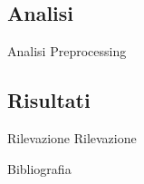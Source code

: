 \documentclass[xcolor={dvipsnames}]{beamer}%
\begin{document}
	\subsection{Analisi}
		\begin{frame}{Analisi}
			Preprocessing
		\end{frame}
	
	\subsection{Risultati}
		\begin{frame}{Rilevazione}
			Rilevazione
		\end{frame}

	\begin{frame}{Bibliografia}
	{
		\scriptsize
		\nocite{anderson2003introduction,mardia1979multivariate,pandasManual,pandasSite,Labib2006}
		
		
	}
	\end{frame}
\end{document}
